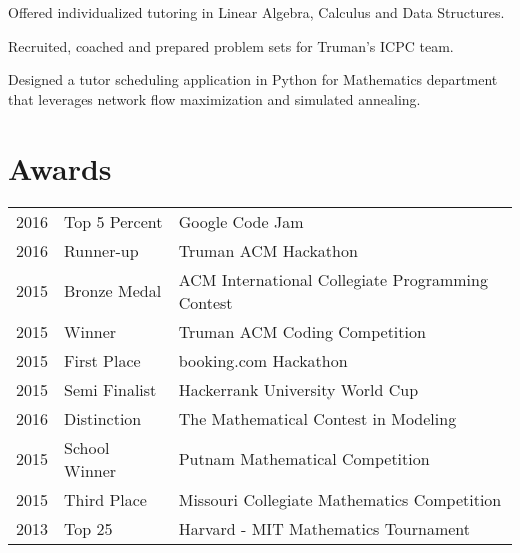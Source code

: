 \documentclass[letterpaper]{deedy-resume} %
\begin{document}
\begin{minipage}[t]{0.66\textwidth}
\sectionspace %



\begin{tightitemize}
\item Offered individualized tutoring in Linear Algebra, Calculus and Data Structures. 
\item Recruited, coached and prepared problem sets for Truman's ICPC team.
\item Designed a tutor scheduling application in Python for Mathematics department that leverages network flow maximization and simulated annealing.
\end{tightitemize}

\sectionspace %

\section{Awards} 

\begin{tabular}{rll}
2016 & Top 5 Percent & Google Code Jam\\
2016 & Runner-up & Truman ACM Hackathon\\
2015 & Bronze Medal & ACM International Collegiate Programming Contest\\
2015 & Winner & Truman ACM Coding Competition\\
2015 & First Place & booking.com Hackathon \\
2015 & Semi Finalist & Hackerrank University World Cup\\
2016 & Distinction & The Mathematical Contest in Modeling \\
2015 & School Winner & Putnam Mathematical Competition\\
2015 & Third Place & Missouri Collegiate Mathematics Competition \\
2013 & Top 25 & Harvard - MIT Mathematics Tournament
\end{tabular}

\sectionspace %


\end{minipage}
\end{document}
